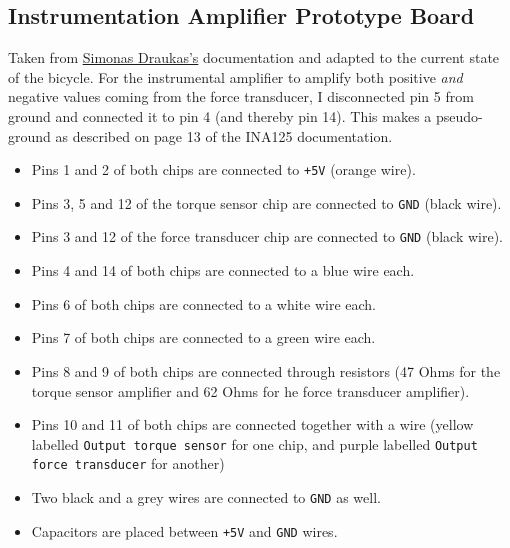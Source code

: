 \subsection{Instrumentation Amplifier Prototype Board}
Taken from \href{https://github.com/mechmotum/TUDelft-SbW-Bicycle/tree/master/docs}{Simonas Draukas's} documentation and adapted to the current state of the bicycle.
For the instrumental amplifier to amplify both positive \textit{and} negative values coming from the force transducer, I disconnected pin 5 from ground and connected it to pin 4 (and thereby pin 14).
This makes a pseudo-ground as described on page 13 of the INA125 documentation.
\begin{itemize}
  \item Pins 1 and 2 of both chips are connected to \verb|+5V| (orange wire).
  \item Pins 3, 5 and 12 of the torque sensor chip are connected to \verb|GND| (black wire).
  \item Pins 3 and 12 of the force transducer chip are connected to \verb|GND| (black wire).
  \item Pins 4 and 14 of both chips are connected to a blue wire each.
  \item Pins 6 of both chips are connected to a white wire each.
  \item Pins 7 of both chips are connected to a green wire each.
  \item Pins 8 and 9 of both chips are connected through resistors (47 Ohms for the torque sensor amplifier and 62 Ohms for he force transducer amplifier).
  \item Pins 10 and 11 of both chips are connected together with a wire (yellow labelled \verb|Output torque sensor| for one chip, and purple labelled \verb|Output force transducer| for another)
  \item Two black and a grey wires are connected to \verb|GND| as well.
  \item Capacitors are placed between \verb|+5V| and \verb|GND| wires.
\end{itemize}

